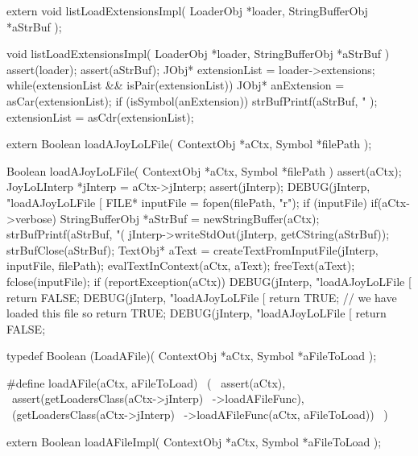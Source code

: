\startCHeader
extern void listLoadExtensionsImpl(
  LoaderObj       *loader,
  StringBufferObj *aStrBuf
);
\stopCHeader
{}

\startCCode
void listLoadExtensionsImpl(
  LoaderObj       *loader,
  StringBufferObj *aStrBuf
) {
  assert(loader);
  assert(aStrBuf);
  JObj* extensionList = loader->extensions;
  while(extensionList && isPair(extensionList)) {
    JObj* anExtension = asCar(extensionList);
    if (isSymbol(anExtension)) {
      strBufPrintf(aStrBuf,
        "%
      );
    }
    extensionList = asCdr(extensionList);
  }
}
\stopCCode

\startCHeader
extern Boolean loadAJoyLoLFile(
  ContextObj *aCtx,
  Symbol     *filePath
);
\stopCHeader
{}

\startCCode
Boolean loadAJoyLoLFile(
  ContextObj *aCtx,
  Symbol     *filePath
) {
  assert(aCtx);
  JoyLoLInterp *jInterp = aCtx->jInterp;
  assert(jInterp);
  DEBUG(jInterp, "loadAJoyLoLFile [%
  FILE* inputFile = fopen(filePath, "r");
  if (inputFile) {
    if(aCtx->verbose) {
      StringBufferObj *aStrBuf = newStringBuffer(aCtx);      
      strBufPrintf(aStrBuf, "(%
      jInterp->writeStdOut(jInterp, getCString(aStrBuf));
      strBufClose(aStrBuf);
    }
    TextObj* aText =
      createTextFromInputFile(jInterp, inputFile, filePath);
    evalTextInContext(aCtx, aText);
    freeText(aText);
    fclose(inputFile);
    if (reportException(aCtx)) {
      DEBUG(jInterp, "loadAJoyLoLFile [%
      return FALSE;
    }
    DEBUG(jInterp, "loadAJoyLoLFile [%
    return TRUE; // we have loaded this file so return TRUE;
  }
  DEBUG(jInterp, "loadAJoyLoLFile [%
  return FALSE;
}
\stopCCode

\startCHeader
typedef Boolean (LoadAFile)(
  ContextObj *aCtx,
  Symbol     *aFileToLoad
);

#define loadAFile(aCtx, aFileToLoad)       \
  (                                        \
    assert(aCtx),                          \
    assert(getLoadersClass(aCtx->jInterp)  \
      ->loadAFileFunc),                    \
    (getLoadersClass(aCtx->jInterp)        \
      ->loadAFileFunc(aCtx, aFileToLoad))  \
  )
\stopCHeader

\setCHeaderStream{private}
\startCHeader
extern Boolean loadAFileImpl(
  ContextObj *aCtx,
  Symbol     *aFileToLoad
);
\stopCHeader
\setCHeaderStream{public}

